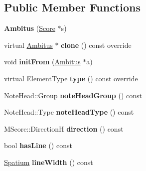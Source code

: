 \subsection*{Public Member Functions}
\begin{DoxyCompactItemize}
\item 
\mbox{\label{class_ms_1_1_ambitus_ab65e3011b64503ceba5614bafa766f2f}} 
{\bfseries Ambitus} (\hyperlink{class_ms_1_1_score}{Score} $\ast$s)
\item 
\mbox{\label{class_ms_1_1_ambitus_aa829028af7964d624e6259c8ff02c5eb}} 
virtual \hyperlink{class_ms_1_1_ambitus}{Ambitus} $\ast$ {\bfseries clone} () const override
\item 
\mbox{\label{class_ms_1_1_ambitus_a9bce2caa3538a8bc7e03855a70cf9d0e}} 
void {\bfseries init\+From} (\hyperlink{class_ms_1_1_ambitus}{Ambitus} $\ast$a)
\item 
\mbox{\label{class_ms_1_1_ambitus_a1ec93033bbc28c03c306aa1753d3f0a0}} 
virtual Element\+Type {\bfseries type} () const override
\item 
\mbox{\label{class_ms_1_1_ambitus_ab4a6ca86914f644354c1e2aaa3919e79}} 
Note\+Head\+::\+Group {\bfseries note\+Head\+Group} () const
\item 
\mbox{\label{class_ms_1_1_ambitus_ab50b8b91d0144592ef27f698710c3042}} 
Note\+Head\+::\+Type {\bfseries note\+Head\+Type} () const
\item 
\mbox{\label{class_ms_1_1_ambitus_a8659e1cc51983bd25ddaf9eba7454d1a}} 
M\+Score\+::\+DirectionH {\bfseries direction} () const
\item 
\mbox{\label{class_ms_1_1_ambitus_ade77026ad8d0c3e6a84c58878d7e5193}} 
bool {\bfseries has\+Line} () const
\item 
\mbox{\label{class_ms_1_1_ambitus_aa59aa215b8e79202c8f78d170570a8c3}} 
\hyperlink{class_ms_1_1_spatium}{Spatium} {\bfseries line\+Width} () const
\item 
\mbox{\label{class_ms_1_1_ambitus_af44fc3c35e9c7c292c25548a13ca014a}} 

\end{DoxyCompactItemize}
